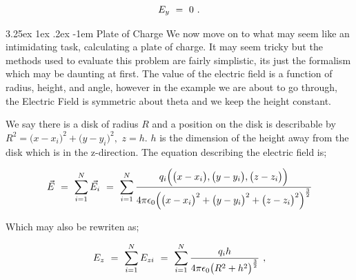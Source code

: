 \documentclass{article}
\makeatletter
\renewcommand\subparagraph{\@startsection{subparagraph}{6}{\parindent}%
  {3.25ex \@plus1ex \@minus .2ex}%
  {-1em}%
  {\normalfont\normalsize\bfseries}}
\makeatother
\begin{document}
\begin{equation} \label{eb-eq-43-1}
E_y \hspace{0.125cm} = \hspace{0.125cm} 0 \hspace{0.125cm} . 
\end{equation}

\subparagraph{Plate of Charge}
We now move on to what may seem like an intimidating task, calculating a plate of charge. It may seem tricky but the methods used to evaluate this problem are fairly simplistic, its just the formalism which may be daunting at first. The value of the electric field is a function of radius, height, and angle, however in the example we are about to go through, the Electric Field is symmetric about theta and we keep the height constant. 

We say there is a disk of radius \begin{math} R \end{math} and a position on the disk is describable by \begin{math} R^{2} = \big(x - x_{i}\big)^{2} + \big(y - y_{i}\big)^{2} , \end{math} \begin{math} z = h \end{math}. \begin{math} h \end{math} is the dimension of the height away from the disk which is in the z-direction. The equation describing the electric field is; 

\begin{equation} \label{eb-eq-44-1}
\vec{E} \hspace{0.125cm} = \hspace{0.125cm} \sum_{i=1}^{N} \vec{E_{i}}
\hspace{0.125cm} = \hspace{0.125cm} \sum_{i=1}^{N} \frac{q_{i}\Big(\big(x - x_{i}\big) , \big(y - y_{i}\big) , \big(z - z_{i}\big)\Big)}{4\pi \epsilon_{0} \Big(\big(x - x_{i}\big)^2 + \big(y - y_{i}\big)^2 + \big(z - z_{i}\big)^2\Big)^{\frac{3}{2}}}
\end{equation}

Which may also be rewriten as;

\begin{equation} \label{eb-eq-45-1}
E_{z} \hspace{0.125cm} = \hspace{0.125cm} \sum_{i=1}^{N} E_{zi}
\hspace{0.125cm} = \hspace{0.125cm} \sum_{i=1}^{N} \frac{q_{i}h}{4\pi \epsilon_{0} \big( R^{2} + h^2\big)^{\frac{3}{2}}} \hspace{0.125cm} , 
\end{equation}
\end{document}
